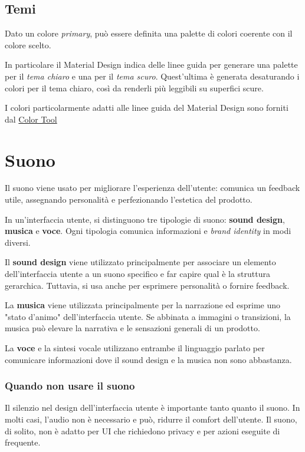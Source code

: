 \documentclass[12pt, a4paper]{report}
\begin{document}
		\subsection{Temi}
		Dato un colore \textit{primary}, può essere definita una palette di colori coerente con il colore scelto.
		
		In particolare il Material Design indica delle linee guida per generare una palette per il \textit{tema chiaro} e una per il \textit{tema scuro}. Quest'ultima è generata desaturando i colori per il tema chiaro, così da renderli più leggibili su superfici scure.

		I colori particolarmente adatti alle linee guida del Material Design sono forniti dal \href{https://material.io/resources/color/#!/?view.left=0&view.right=0&primary.color=6002ee}{Color Tool} \cite{color_tool}

   \section{Suono}
   	    Il suono viene usato per migliorare l'esperienza dell'utente: comunica un feedback utile, assegnando personalità e
   	    perfezionando l’estetica del prodotto.

   	    In un'interfaccia utente, si distinguono tre tipologie di suono: \textbf{sound design}, \textbf{musica} e \textbf{voce}. Ogni tipologia comunica informazioni e \textit{brand identity} in modi diversi.

   	    Il \textbf{sound design} viene utilizzato principalmente per associare un elemento dell'interfaccia utente a un suono specifico e far capire qual è la struttura gerarchica.
		Tuttavia, si usa anche per esprimere personalità o fornire feedback.


        La \textbf{musica} viene utilizzata principalmente per la narrazione ed esprime uno "stato d'animo" dell'interfaccia utente.
        Se abbinata a immagini o transizioni, la musica può elevare la narrativa e le sensazioni generali di un prodotto.



        La \textbf{voce} e la sintesi vocale utilizzano entrambe il linguaggio parlato per comunicare informazioni dove il sound
        design e la musica non sono abbastanza.

        \subsubsection{Quando non usare il suono}
                	Il silenzio nel design dell'interfaccia utente è importante tanto quanto il suono. In molti casi, l’audio non è necessario e può,
                    ridurre il comfort dell'utente. Il suono, di solito, non è adatto per UI che richiedono privacy e per azioni eseguite di frequente.
\end{document}
